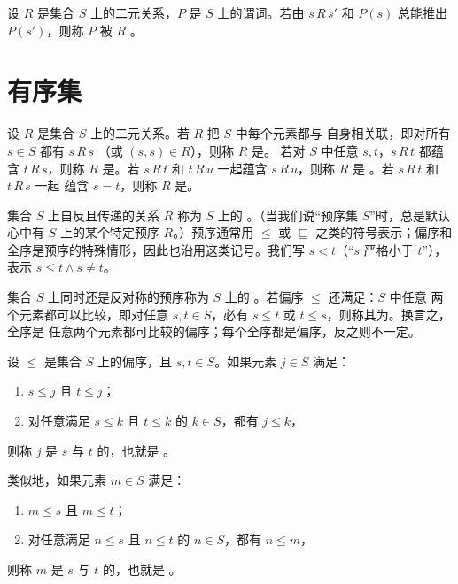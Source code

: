 \begin{definition}
\label{def:2.1.10}
设 \(R\) 是集合 \(S\) 上的二元关系，\(P\) 是 \(S\) 上的谓词。若由
\(s\,R\,s'\) 和 \(P(s)\) 总能推出 \(P(s')\)，则称 \(P\) 被 \(R\)
。
\end{definition}

\section{有序集}
\label{sec:2.2}

\begin{definition}
\label{def:2.2.1}
设 \(R\) 是集合 \(S\) 上的二元关系。若 \(R\) 把 \(S\) 中每个元素都与
自身相关联，即对所有 \(s\in S\) 都有 \(s\,R\,s\)
（或 \((s,s)\in R\)），则称 \(R\) 是。
若对 \(S\) 中任意 \(s,t\)，\(s\,R\,t\) 都蕴含 \(t\,R\,s\)，则称
\(R\) 是。若 \(s\,R\,t\) 和
\(t\,R\,u\) 一起蕴含 \(s\,R\,u\)，则称 \(R\) 是
。若 \(s\,R\,t\) 和 \(t\,R\,s\) 一起
蕴含 \(s=t\)，则称 \(R\) 是。
\end{definition}

\begin{definition}
\label{def:2.2.2}
集合 \(S\) 上自反且传递的关系 \(R\) 称为 \(S\) 上的
。（当我们说“预序集 \(S\)”时，总是默认心中有
\(S\) 上的某个特定预序 \(R\)。）预序通常用 \(\leq\) 或 \(\sqsubseteq\)
之类的符号表示；偏序和全序是预序的特殊情形，因此也沿用这类记号。我们写
\(s<t\)（“\(s\) 严格小于 \(t\)”），表示 \(s\leq t\land s\neq t\)。

集合 \(S\) 上同时还是反对称的预序称为 \(S\) 上的
。若偏序 \(\leq\) 还满足：\(S\) 中任意
两个元素都可以比较，即对任意 \(s,t\in S\)，必有 \(s\leq t\) 或
\(t\leq s\)，则称其为。换言之，全序是
任意两个元素都可比较的偏序；每个全序都是偏序，反之则不一定。
\end{definition}

\begin{definition}
\label{def:2.2.3}
设 \(\leq\) 是集合 \(S\) 上的偏序，且 \(s,t\in S\)。如果元素 \(j\in S\)
满足：
\begin{enumerate}
  \item \(s\leq j\) 且 \(t\leq j\)；
  \item 对任意满足 \(s\leq k\) 且 \(t\leq k\) 的 \(k\in S\)，都有
    \(j\leq k\)，
\end{enumerate}
则称 \(j\) 是 \(s\) 与 \(t\) 的，也就是
。

类似地，如果元素 \(m\in S\) 满足：
\begin{enumerate}
  \item \(m\leq s\) 且 \(m\leq t\)；
  \item 对任意满足 \(n\leq s\) 且 \(n\leq t\) 的 \(n\in S\)，都有
    \(n\leq m\)，
\end{enumerate}
则称 \(m\) 是 \(s\) 与 \(t\) 的，也就是
。
\end{definition}

